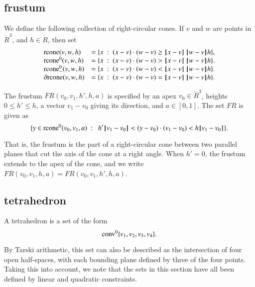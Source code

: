 \subsection{frustum}

\begin{definition}[rcone]
We define the following collection of right-circular cones.
If $v$ and $w$ are points in $\ring{R}^3$, and
  $h\in\ring{R}$, then set
  $$\begin{array}{lll}
    \op{rcone}(v,w,h) &= \{x\mid (x-v)\cdot (w-v) \ge \norm{x}{v}\,\norm{w}{v} h\},\\
    \op{rcone}^0(v,w,h) &= \{x\mid (x-v)\cdot (w-v) > \norm{x}{v}\,\norm{w}{v} h\}.\\
    \op{rcone}_-^0(v,w,h) &= \{x\mid (x-v)\cdot (w-v) < \norm{x}{v}\,\norm{w}{v} h\}.\\
    \partial\op{rcone}(v,w,h) &= \{x\mid (x-v)\cdot (w-v) = \norm{x}{v}\,\norm{w}{v} h\}.\\
    \end{array}
    $$
\end{definition}



\begin{definition}[frustum, FR] The frustum
$FR(v_0,v_1,h',h,a)$ is specified by an apex $v_0\in\ring{R}^3$, heights
$0\le h'\le h$, a vector $v_1-v_0$ giving its direction, and
$a\in[0,1]$. The set $FR$ is given as
    $$
    \{ y \in\op{rcone}^0(v_0,v_1,a) \mid \ 
       h'\norm{v_1}{v_0} < (y-v_0) \cdot (v_1-v_0) < h\norm{v_1}{v_0} \}.
    $$
\end{definition}

That is, the frustum is the part of a right-circular cone between two
parallel planes that cut the axis of the cone at a right angle.
When $h'=0$, the frustum extends to the apex of the cone, and
we write $FR(v_0,v_1,h,a)=FR(v_0,v_1,h',h,a)$.

\subsection{tetrahedron}

\begin{definition}[tetrahedron] A tetrahedron is a set of the form
$${\operatorname{conv}}^0\{v_1,v_2,v_3,v_4\}.$$
\end{definition}

By Tarski arithmetic, this set can also be described
as the intersection of four open half-spaces, with each bounding
plane defined by three of the four points.
Taking this into account, we note that
the sets in this section have all been defined by linear and quadratic
constraints.

